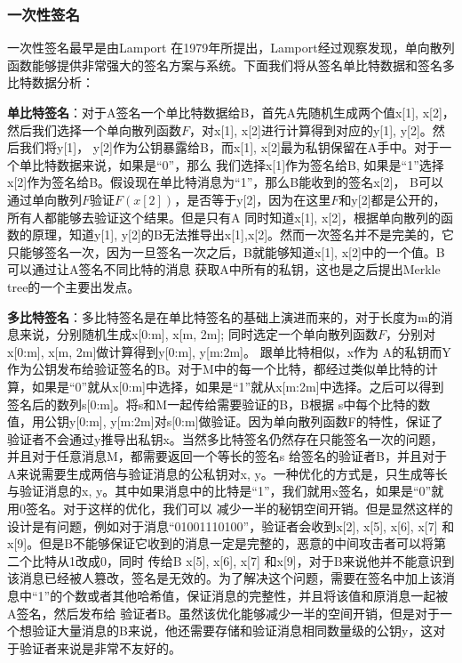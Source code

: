 \subsubsection{一次性签名}
一次性签名最早是由Lamport \cite{diffie1976new}在1979年所提出，Lamport经过观察发现，单向散列函数能够提供非常强大的签名方案与系统。下面我们将从签名单比特数据和签名多比特数据分析：

\textbf{单比特签名}：对于A签名一个单比特数据给B，首先A先随机生成两个值x[1], x[2]，然后我们选择一个单向散列函数$F$，对x[1], x[2]进行计算得到对应的y[1], y[2]。然后我们将y[1]， y[2]作为公钥暴露给B，而x[1], x[2]最为私钥保留在A手中。对于一个单比特数据来说，如果是“0”，那么
我们选择x[1]作为签名给B, 如果是“1”选择x[2]作为签名给B。假设现在单比特消息为“1”，那么B能收到的签名x[2]， B可以通过单向散列$F$验证$F(x[2])$，是否等于y[2]，因为在这里$F$和y[2]都是公开的，所有人都能够去验证这个结果。但是只有A
同时知道x[1], x[2]，根据单向散列的函数的原理，知道y[1], y[2]的B无法推导出x[1],x[2]。然而一次签名并不是完美的，它只能够签名一次，因为一旦签名一次之后，B就能够知道x[1], x[2]中的一个值。B可以通过让A签名不同比特的消息
获取A中所有的私钥，这也是之后提出Merkle tree的一个主要出发点。

\textbf{多比特签名}：多比特签名是在单比特签名的基础上演进而来的，对于长度为m的消息来说，分别随机生成x[0:m], x[m, 2m]; 同时选定一个单向散列函数$F$，分别对x[0:m], x[m, 2m]做计算得到y[0:m], y[m:2m]。 跟单比特相似，x作为
A的私钥而Y作为公钥发布给验证签名的B。对于M中的每一个比特，都经过类似单比特的计算，如果是“0”就从x[0:m]中选择，如果是“1”就从x[m:2m]中选择。之后可以得到签名后的数列s[0:m]。将s和M一起传给需要验证的B，B根据
s中每个比特的数值，用公钥y[0:m], y[m:2m]对s[0:m]做验证。因为单向散列函数F的特性，保证了验证者不会通过y推导出私钥x。当然多比特签名仍然存在只能签名一次的问题，并且对于任意消息M，都需要返回一个等长的签名s
给签名的验证者B，并且对于A来说需要生成两倍与验证消息的公私钥对x, y。一种优化的方式是，只生成等长与验证消息的x, y。其中如果消息中的比特是“1”，我们就用x签名，如果是“0”就用0签名。对于这样的优化，我们可以
减少一半的秘钥空间开销。但是显然这样的设计是有问题，例如对于消息“01001110100”，验证者会收到x[2], x[5], x[6], x[7] 和x[9]。但是B不能够保证它收到的消息一定是完整的，恶意的中间攻击者可以将第二个比特从1改成0，同时
传给B x[5], x[6], x[7] 和x[9]，对于B来说他并不能意识到该消息已经被人篡改，签名是无效的。为了解决这个问题，需要在签名中加上该消息中“1”的个数或者其他哈希值，保证消息的完整性，并且将该值和原消息一起被A签名，然后发布给
验证者B。虽然该优化能够减少一半的空间开销，但是对于一个想验证大量消息的B来说，他还需要存储和验证消息相同数量级的公钥y，这对于验证者来说是非常不友好的。

